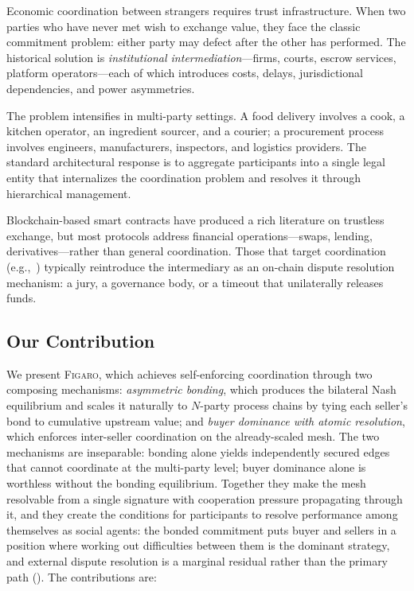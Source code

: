 \documentclass[11pt,a4paper]{article}
\theoremstyle{definition}
\theoremstyle{remark}
\newcommand{\figaro}{\textsc{Figaro}}
\begin{document}
Economic coordination between strangers requires trust infrastructure.
When two parties who have never met wish to exchange value, they face
the classic commitment problem: either party may defect after the
other has performed. The historical solution is \emph{institutional
intermediation}---firms, courts, escrow services, platform
operators---each of which introduces costs, delays, jurisdictional
dependencies, and power asymmetries.

The problem intensifies in multi-party settings. A food delivery
involves a cook, a kitchen operator, an ingredient sourcer, and a
courier; a procurement process involves engineers, manufacturers,
inspectors, and logistics providers. The standard architectural
response is to aggregate participants into a single legal entity that
internalizes the coordination problem and resolves it through
hierarchical management.

Blockchain-based smart contracts have produced a rich literature on
trustless exchange, but most protocols address financial
operations---swaps, lending, derivatives---rather than general
coordination. Those that target coordination
(e.g.,~\citep{kleros2019,aragon2017}) typically reintroduce the
intermediary as an on-chain dispute resolution mechanism: a jury, a
governance body, or a timeout that unilaterally releases funds.

\subsection{Our Contribution}

We present \figaro{}, which achieves self-enforcing coordination
through two composing mechanisms: \emph{asymmetric bonding}, which
produces the bilateral Nash equilibrium and scales it naturally to
$N$-party process chains by tying each seller's bond to cumulative
upstream value; and \emph{buyer dominance with atomic resolution},
which enforces inter-seller coordination on the already-scaled mesh.
The two mechanisms are inseparable: bonding alone yields independently
secured edges that cannot coordinate at the multi-party level; buyer
dominance alone is worthless without the bonding equilibrium. Together
they make the mesh resolvable from a single signature with cooperation
pressure propagating through it, and they create the conditions for
participants to resolve performance among themselves as social agents:
the bonded commitment puts buyer and sellers in a position where
working out difficulties between them is the dominant strategy, and
external dispute resolution is a marginal residual rather than the
primary path (). The contributions are:
\end{document}
